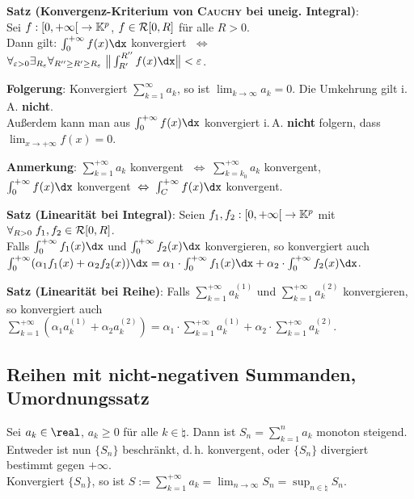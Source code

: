 \textbf{Satz (Konvergenz-Kriterium von \textsc{Cauchy} bei uneig. Integral)}:
\\
Sei $f: \left[0,+\infty\right[ \rightarrow \mathbb{K}^p$,
$f \in \mathcal{R}[0, R]$ für alle $R > 0$. \\
Dann gilt:
$\int_0^{+\infty} f(x)\dx$ konvergiert $\;\Leftrightarrow\;$
$\forall_{\varepsilon > 0} \exists_{R_\varepsilon}
\forall_{R'' \ge R' \ge R_\varepsilon}\;
\big\Vert \int_{R'}^{R''} f(x)\dx \big\Vert < \varepsilon$.

\linie

\textbf{Folgerung}:
Konvergiert $\sum_{k=1}^\infty a_k$, so ist $\lim_{k \to \infty} a_k = 0$.
\qquad
Die Umkehrung gilt i.\,A. \textbf{nicht}. \\
Außerdem kann man aus $\int_0^{+\infty} f(x)\dx$ konvergiert i.\,A.
\textbf{nicht} folgern, dass $\lim_{x \to +\infty} f(x) = 0$.

\textbf{Anmerkung}:
$\sum_{k=1}^{+\infty} a_k$ konvergent
$\;\Leftrightarrow\; \sum_{k=k_0}^{+\infty} a_k$ konvergent, \\
$\int_0^{+\infty} f(x)\dx$ konvergent
$\;\Leftrightarrow\; \int_C^{+\infty} f(x)\dx$ konvergent.

\linie

\textbf{Satz (Linearität bei Integral)}:
Seien $f_1, f_2: \left[0,+\infty\right[ \rightarrow \mathbb{K}^p$
mit $\forall_{R > 0}\; f_1, f_2 \in \mathcal{R}[0,R]$. \\
Falls $\int_0^{+\infty} f_1(x)\dx$ und $\int_0^{+\infty} f_2(x)\dx$ konvergieren,
so konvergiert auch \\
$\int_0^{+\infty} (\alpha_1 f_1(x) + \alpha_2 f_2(x))\dx
= \alpha_1 \cdot \int_0^{+\infty} f_1(x)\dx +
\alpha_2 \cdot \int_0^{+\infty} f_2(x)\dx$.

\textbf{Satz (Linearität bei Reihe)}:
Falls $\sum_{k=1}^{+\infty} a^{(1)}_k$ und $\sum_{k=1}^{+\infty} a^{(2)}_k$
konvergieren, so konvergiert auch
$\sum_{k=1}^{+\infty} (\alpha_1 a^{(1)}_k + \alpha_2 a^{(2)}_k)
= \alpha_1 \cdot \sum_{k=1}^{+\infty} a^{(1)}_k +
\alpha_2 \cdot \sum_{k=1}^{+\infty} a^{(2)}_k$.

\subsection{%
    Reihen mit nicht-negativen Summanden, Umordnungssatz%
}

Sei $a_k \in \real$, $a_k \ge 0$ für alle $k \in \natural$.
Dann ist $S_n = \sum_{k=1}^n a_k$ monoton steigend. \\
Entweder ist nun $\{S_n\}$ beschränkt, d.\,h. konvergent,
oder $\{S_n\}$ divergiert bestimmt gegen $+\infty$. \\
Konvergiert $\{S_n\}$, so ist $S := \sum_{k=1}^{+\infty} a_k
= \lim_{n \to \infty} S_n = \sup_{n \in \natural} S_n$.

